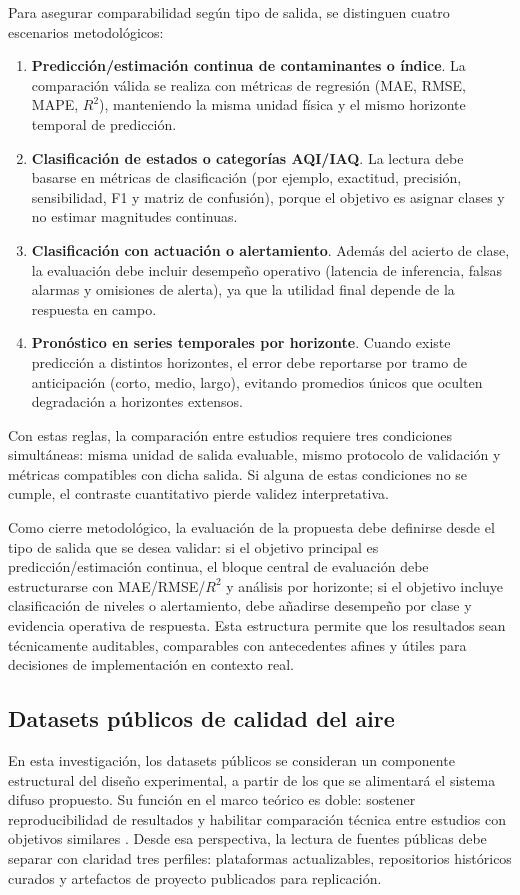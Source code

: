 Para asegurar comparabilidad según tipo de salida, se distinguen cuatro escenarios metodológicos:
\begin{enumerate}
\item \textbf{Predicción/estimación continua de contaminantes o índice}. La comparación válida se realiza con métricas de regresión (MAE, RMSE, MAPE, \(R^2\)), manteniendo la misma unidad física y el mismo horizonte temporal de predicción.
\item \textbf{Clasificación de estados o categorías AQI/IAQ}. La lectura debe basarse en métricas de clasificación (por ejemplo, exactitud, precisión, sensibilidad, F1 y matriz de confusión), porque el objetivo es asignar clases y no estimar magnitudes continuas.
\item \textbf{Clasificación con actuación o alertamiento}. Además del acierto de clase, la evaluación debe incluir desempeño operativo (latencia de inferencia, falsas alarmas y omisiones de alerta), ya que la utilidad final depende de la respuesta en campo.
\item \textbf{Pronóstico en series temporales por horizonte}. Cuando existe predicción a distintos horizontes, el error debe reportarse por tramo de anticipación (corto, medio, largo), evitando promedios únicos que oculten degradación a horizontes extensos.
\end{enumerate}

Con estas reglas, la comparación entre estudios requiere tres condiciones simultáneas: misma unidad de salida evaluable, mismo protocolo de validación y métricas compatibles con dicha salida. Si alguna de estas condiciones no se cumple, el contraste cuantitativo pierde validez interpretativa.

Como cierre metodológico, la evaluación de la propuesta debe definirse desde el tipo de salida que se desea validar: si el objetivo principal es predicción/estimación continua, el bloque central de evaluación debe estructurarse con MAE/RMSE/\(R^2\) y análisis por horizonte; si el objetivo incluye clasificación de niveles o alertamiento, debe añadirse desempeño por clase y evidencia operativa de respuesta. Esta estructura permite que los resultados sean técnicamente auditables, comparables con antecedentes afines y útiles para decisiones de implementación en contexto real.

\subsection{Datasets públicos de calidad del aire}
En esta investigación, los datasets públicos se consideran un componente estructural del diseño experimental, a partir de los que se alimentará el sistema difuso propuesto. Su función en el marco teórico es doble: sostener reproducibilidad de resultados y habilitar comparación técnica entre estudios con objetivos similares \cite{A135,A144,A178,A084,A028}. Desde esa perspectiva, la lectura de fuentes públicas debe separar con claridad tres perfiles: plataformas actualizables, repositorios históricos curados y artefactos de proyecto publicados para replicación.

